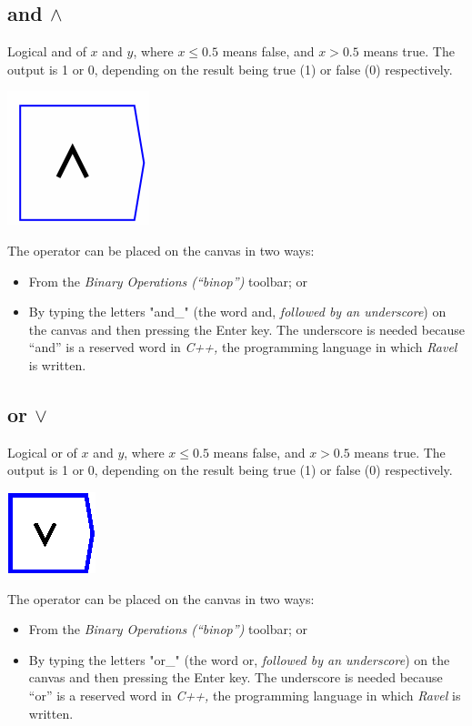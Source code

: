 \subsection{and $\wedge$}

\label{Operation:and_} Logical and of $x$ and $y$, where $x\le0.5$
means false, and $x>0.5$ means true. The output is 1 or 0, depending
on the result being true (1) or false (0) respectively.

\includegraphics{images/andkey}

The operator can be placed on the canvas in two ways:
\begin{itemize}
\item From the \emph{Binary Operations (``binop'') }toolbar; or 
\item By typing the letters "and\_" (the word and, \emph{followed by an
underscore}) on the canvas and then pressing the Enter key. The underscore
is needed because ``and'' is a reserved word in \emph{C++,} the
programming language in which \emph{Ravel} is written.
\end{itemize}

\subsection{or $\vee$}

\label{Operation:or_} Logical or of $x$ and $y$, where $x\le0.5$
means false, and $x>0.5$ means true. The output is 1 or 0, depending
on the result being true (1) or false (0) respectively.

\includegraphics{images/or}

The operator can be placed on the canvas in two ways:
\begin{itemize}
\item From the \emph{Binary Operations (``binop'') }toolbar; or 
\item By typing the letters "or\_" (the word or, \emph{followed by an
underscore}) on the canvas and then pressing the Enter key. The underscore
is needed because ``or'' is a reserved word in \emph{C++,} the programming
language in which \emph{Ravel} is written.
\end{itemize}

